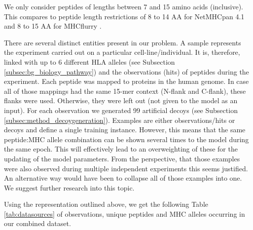 \documentclass[msc,deptreport,ai]{infthesis} %
\begin{document}
		We only consider peptides of lengths between 7 and 15 amino acids (inclusive). This compares to peptide length restrictions of 8 to 14 \gls{AA} for NetMHCpan 4.1 \cite{reynisson_netmhcpan-41_2020} and 8 to 15 \gls{AA} for MHCflurry \cite{odonnell_mhcflurry_2020}.
	
		There are several distinct entities present in our problem. A sample represents the experiment carried out on a particular cell-line/individual. It is, therefore, linked with up to 6 different \gls{HLA} alleles (see Subsection \ref{subsec:bg_biology_pathway}) and the observations (hits) of peptides during the experiment. Each peptide was mapped to proteins in the human genome. In case all of those mappings had the same 15-mer context (N-flank and C-flank), these flanks were used. Otherwise, they were left out (not given to the model as an input). For each observation we generated 99 artificial decoys (see Subsection \ref{subsec:method_decoygeneration}). Examples are either observations/hits or decoys and define a single training instance. However, this means that the same peptide:\gls{MHC} allele combination can be shown several times to the model during the same epoch. This will effectively lead to an overweighting of these for the updating of the model parameters. From the perspective, that those examples were also observed during multiple independent experiments this seems justified. An alternative way would have been to collapse all of those examples into one. We suggest further research into this topic.
	  
			
		Using the representation outlined above, we get the following Table \ref{tab:datasources} of observations, unique peptides and \gls{MHC} alleles occurring in our combined dataset.
		
\end{document}
